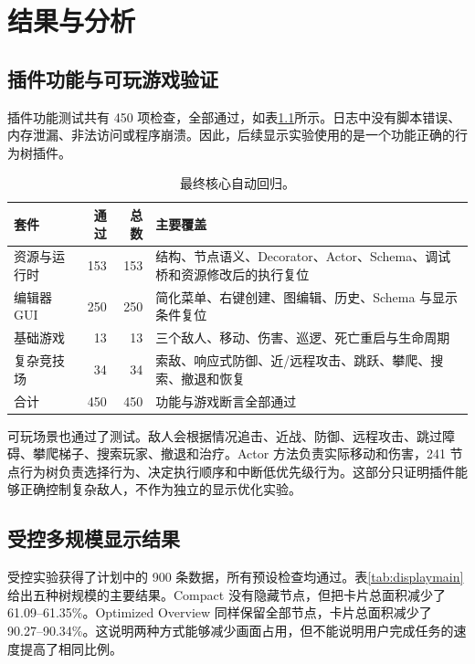 \chapter{结果与分析}
\label{ch:results}

\section{插件功能与可玩游戏验证}

插件功能测试共有 450 项检查，全部通过，如表\ref{tab:coretests}所示。日志中没有脚本错误、内存泄漏、非法访问或程序崩溃。因此，后续显示实验使用的是一个功能正确的行为树插件。

\begin{table}[htbp]
\centering\caption{最终核心自动回归。}\label{tab:coretests}
\begin{tabular}{lrrp{}}
\toprule 套件 & 通过 & 总数 & 主要覆盖 \\
\midrule
资源与运行时 & 153 & 153 & 结构、节点语义、Decorator、Actor、Schema、调试桥和资源修改后的执行复位\\
编辑器 GUI & 250 & 250 & 简化菜单、右键创建、图编辑、历史、Schema 与显示条件复位\\
基础游戏 & 13 & 13 & 三个敌人、移动、伤害、巡逻、死亡重启与生命周期\\
复杂竞技场 & 34 & 34 & 索敌、响应式防御、近/远程攻击、跳跃、攀爬、搜索、撤退和恢复\\
\midrule 合计 & 450 & 450 & 功能与游戏断言全部通过\\
\bottomrule
\end{tabular}
\end{table}

可玩场景也通过了测试。敌人会根据情况追击、近战、防御、远程攻击、跳过障碍、攀爬梯子、搜索玩家、撤退和治疗。Actor 方法负责实际移动和伤害，241 节点行为树负责选择行为、决定执行顺序和中断低优先级行为。这部分只证明插件能够正确控制复杂敌人，不作为独立的显示优化实验。

\section{受控多规模显示结果}

受控实验获得了计划中的 900 条数据，所有预设检查均通过。表\ref{tab:displaymain}给出五种树规模的主要结果。Compact 没有隐藏节点，但把卡片总面积减少了 61.09--61.35\%。Optimized Overview 同样保留全部节点，卡片总面积减少了 90.27--90.34\%。这说明两种方式能够减少画面占用，但不能说明用户完成任务的速度提高了相同比例。

